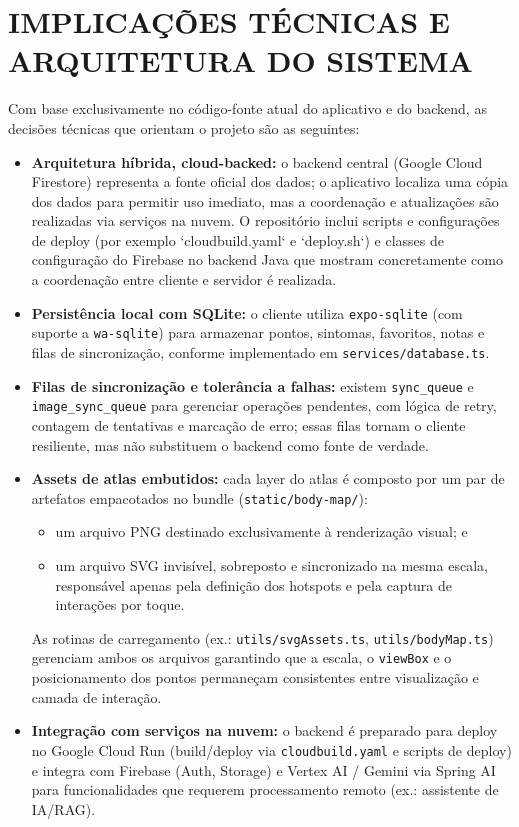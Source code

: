 \section{IMPLICA\c{C}\~OES TÉCNICAS E ARQUITETURA DO SISTEMA} \label{sec:implicacoes_tecnicas}

Com base exclusivamente no código-fonte atual do aplicativo e do backend, as decisões técnicas que orientam o projeto são as seguintes:

\begin{itemize}
    \item \textbf{Arquitetura híbrida, cloud-backed:} o backend central (Google Cloud Firestore) representa a fonte oficial dos dados; o aplicativo localiza uma cópia dos dados para permitir uso imediato, mas a coordenação e atualizações são realizadas via serviços na nuvem. O repositório inclui scripts e configurações de deploy (por exemplo `cloudbuild.yaml` e `deploy.sh`) e classes de configuração do Firebase no backend Java que mostram concretamente como a coordenação entre cliente e servidor é realizada.
    \item \textbf{Persistência local com SQLite:} o cliente utiliza \texttt{expo-sqlite} (com suporte a \texttt{wa-sqlite}) para armazenar pontos, sintomas, favoritos, notas e filas de sincronização, conforme implementado em \texttt{services/database.ts}.
    \item \textbf{Filas de sincronização e tolerância a falhas:} existem \texttt{sync\_queue} e \texttt{image\_sync\_queue} para gerenciar operações pendentes, com lógica de retry, contagem de tentativas e marcação de erro; essas filas tornam o cliente resiliente, mas não substituem o backend como fonte de verdade.
    \item \textbf{Assets de atlas embutidos:} cada layer do atlas é composto por um par de artefatos empacotados no bundle (\texttt{static/body-map/}):
    \begin{itemize}
        \item um arquivo PNG destinado exclusivamente à renderização visual; e
        \item um arquivo SVG invisível, sobreposto e sincronizado na mesma escala, responsável apenas pela definição dos hotspots e pela captura de interações por toque.
    \end{itemize}
    As rotinas de carregamento (ex.: \texttt{utils/svgAssets.ts}, \texttt{utils/bodyMap.ts}) gerenciam ambos os arquivos garantindo que a escala, o \texttt{viewBox} e o posicionamento dos pontos permaneçam consistentes entre visualização e camada de interação.
    \item \textbf{Integração com serviços na nuvem:} o backend é preparado para deploy no Google Cloud Run (build/deploy via \texttt{cloudbuild.yaml} e scripts de deploy) e integra com Firebase (Auth, Storage) e Vertex AI / Gemini via Spring AI para funcionalidades que requerem processamento remoto (ex.: assistente de IA/RAG).
\end{itemize}

